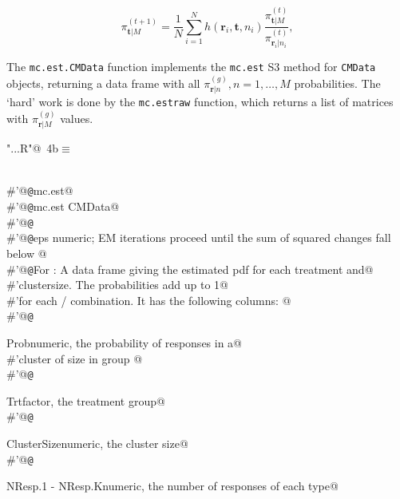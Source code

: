 \documentclass[reqno]{amsart}
\renewcommand{\NWtarget}[2]{\hypertarget{#1}{#2}}
\newcommand{\rvec}{\mathbf{r}}
\newcommand{\tvec}{\mathbf{t}}
\begin{document}
\begin{equation}\label{F:EMupdate0}
 \pi_{\tvec|M}^{(t+1)} = \frac{1}{N} \sum_{i=1}^{N} h(\rvec_{i},\tvec,n_{i})
             \frac{\pi^{(t)}_{\tvec|M}}{\pi^{(t)}_{\rvec_{i}|n_{i}}},
\end{equation}

The \texttt{mc.est.CMData} function implements the \texttt{mc.est} S3 method for \texttt{CMData} objects, 
returning a data frame with all  $\pi^{(g)}_{\rvec|n}, n=1,\ldots, M$ probabilities. The `hard' work is done
by the \texttt{mc.estraw} function, which returns a list of matrices with  $\pi^{(g)}_{\rvec|M}$ values.
\begin{flushleft} \small\label{scrap19}\raggedright\small
\NWtarget{nuweb4b}{} \verb@"..\R\ExchMultinomial.R"@\nobreak\ {\footnotesize {4b}}$\equiv$
\vspace{-1ex}
\begin{list}{}{} \item
\mbox{}\verb@@\\
\mbox{}\verb@#'@{\tt @}\verb@rdname mc.est@\\
\mbox{}\verb@#'@{\tt @}\verb@method mc.est CMData@\\
\mbox{}\verb@#'@{\tt @}\verb@export@\\
\mbox{}\verb@#'@{\tt @}\verb@param eps numeric; EM iterations proceed until the sum of squared changes fall below   @\\
\mbox{}\verb@#'@{\tt @}\verb@return For : A data frame giving the estimated pdf for each treatment and@\\
\mbox{}\verb@#'clustersize.  The probabilities add up to 1@\\
\mbox{}\verb@#'for each / combination. It has the following columns: @\\
\mbox{}\verb@#'@{\tt @}\verb@return \item{Prob}{numeric, the probability of  responses in a@\\
\mbox{}\verb@#'cluster of size  in group }@\\
\mbox{}\verb@#'@{\tt @}\verb@return \item{Trt}{factor, the treatment group}@\\
\mbox{}\verb@#'@{\tt @}\verb@return \item{ClusterSize}{numeric, the cluster size}@\\
\mbox{}\verb@#'@{\tt @}\verb@return \item{NResp.1 - NResp.K}{numeric, the number of responses of each type}@\\

\end{list}
\end{flushleft}
\end{document}
